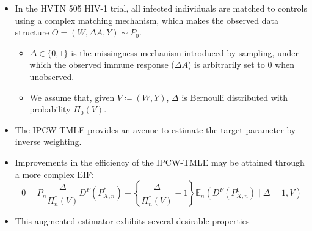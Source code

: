 \documentclass[landscape,a0paper,fontscale=0.285]{baposter} %
\begin{document}
\begin{poster}
{\vspace{-0.35em}
\begin{itemize}
\itemsep0.1pt
\item In the HVTN 505 HIV-1 trial, all infected individuals are matched to
  controls using a complex matching mechanism, which makes the observed data
  structure \textbf{$O = (W, \Delta A, Y) \sim P_0$}.
  \vspace{-0.25em}
  \begin{itemize}
    \itemsep0pt
    \item $\Delta \in \{0, 1\}$ is the missingness mechanism introduced
      by sampling, under which the observed immune response ($\Delta A$) is
      arbitrarily set to $0$ when unobserved.
    \item We assume that, given $V \coloneqq (W, Y)$, $\Delta$ is Bernoulli
      distributed with probability $\Pi_0(V)$.
  \end{itemize}
\item The IPCW-TMLE \cite{rose2011targeted2sd} provides an avenue to estimate
  the target parameter by inverse weighting.
\item Improvements in the efficiency of the IPCW-TMLE may be attained through a
  more complex EIF:
  $$ 0 = P_n \frac{\Delta}{\Pi_n^*(V)}D^F(P^*_{X,n}) -
      \left\{\frac{\Delta}{\Pi_n^*(V)} - 1 \right\} \mathbb{E}_n(D^F(P^0_{X,n})
      \mid \Delta = 1, V)$$
\item This augmented estimator exhibits several desirable properties

\end{itemize}}
\end{poster}
\end{document}

